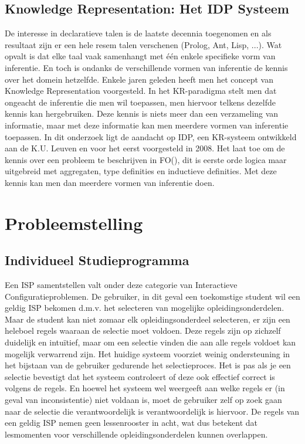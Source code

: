 \subsection{Knowledge Representation: Het IDP Systeem}
De interesse in declaratieve talen is de laatste decennia toegenomen en als resultaat zijn er een hele resem talen verschenen (Prolog, Ant, Lisp, ...). Wat opvalt is dat elke taal vaak samenhangt met \'{e}\'{e}n enkele specifieke vorm van inferentie. En toch is ondanks de verschillende vormen van inferentie de kennis over het domein hetzelfde. Enkele jaren geleden heeft men het concept van Knowledge Representation \citep{denecker2008building} voorgesteld. In het KR-paradigma stelt men dat ongeacht de inferentie die men wil toepassen, men hiervoor telkens dezelfde kennis kan hergebruiken. Deze kennis is niets meer dan een verzameling van informatie, maar met deze informatie kan men meerdere vormen van inferentie toepassen. In dit onderzoek ligt de aandacht op IDP, een KR-systeem ontwikkeld aan de K.U. Leuven en voor het eerst voorgesteld in 2008. Het laat toe om de kennis over een probleem te beschrijven in FO(\textperiodcentered), dit is eerste orde logica maar uitgebreid met aggregaten, type definities en inductieve definities. Met deze kennis kan men dan meerdere vormen van inferentie doen. 

\section{Probleemstelling}

\subsection{Individueel Studieprogramma}
Een ISP samentstellen valt onder deze categorie van Interactieve Configuratieproblemen. De gebruiker, in dit geval een toekomstige student wil een geldig ISP bekomen d.m.v. het selecteren van mogelijke opleidingsonderdelen. Maar de student kan niet zomaar elk opleidingsonderdeel selecteren, er zijn een heleboel regels waaraan de selectie moet voldoen. Deze regels zijn op zichzelf duidelijk en intu\"{i}tief, maar om een selectie vinden die aan alle regels voldoet kan mogelijk verwarrend zijn. Het huidige systeem voorziet weinig ondersteuning in het bijstaan van de gebruiker gedurende het selectieproces. Het is pas als je een selectie bevestigt dat het systeem controleert of deze ook effectief correct is volgens de regels. En hoewel het systeem wel weergeeft aan welke regels er (in geval van inconsistentie) niet voldaan is, moet de gebruiker zelf op zoek gaan naar de selectie die verantwoordelijk is verantwoordelijk is hiervoor. De regels van een geldig ISP nemen geen lessenrooster in acht, wat dus betekent dat lesmomenten voor verschillende opleidingsonderdelen kunnen overlappen. 


